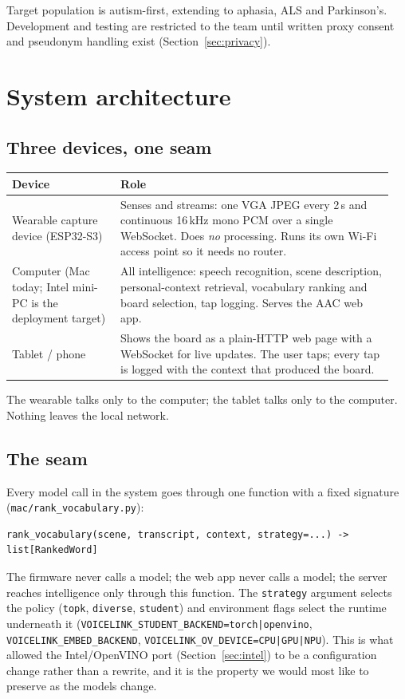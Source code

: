\documentclass[11pt]{article}
\newcommand{\code}[1]{\texttt{#1}}
\newcommand{\file}[1]{\texttt{\small #1}}
\begin{document}
Target population is autism-first, extending to aphasia, ALS and Parkinson's.
Development and testing are restricted to the team until written proxy consent
and pseudonym handling exist (Section~\ref{sec:privacy}).

\section{System architecture}
\subsection{Three devices, one seam}
\begin{center}
\begin{tabular}{@{}p{0.27\linewidth}p{0.68\linewidth}@{}}
\toprule
\textbf{Device} & \textbf{Role} \\ \midrule
Wearable capture device (ESP32-S3) & Senses and streams: one VGA JPEG every 2\,s and continuous 16\,kHz mono PCM over a single WebSocket. Does \emph{no} processing. Runs its own Wi-Fi access point so it needs no router. \\
Computer (Mac today; Intel mini-PC is the deployment target) & All intelligence: speech recognition, scene description, personal-context retrieval, vocabulary ranking and board selection, tap logging. Serves the AAC web app. \\
Tablet / phone & Shows the board as a plain-HTTP web page with a WebSocket for live updates. The user taps; every tap is logged with the context that produced the board. \\
\bottomrule
\end{tabular}
\end{center}
The wearable talks only to the computer; the tablet talks only to the computer.
Nothing leaves the local network.

\subsection{The seam}
Every model call in the system goes through one function with a fixed signature
(\file{mac/rank\_vocabulary.py}):
\begin{lstlisting}
rank_vocabulary(scene, transcript, context, strategy=...) -> list[RankedWord]
\end{lstlisting}
The firmware never calls a model; the web app never calls a model; the server
reaches intelligence only through this function. The \code{strategy} argument
selects the policy (\code{topk}, \code{diverse}, \code{student}) and environment
flags select the runtime underneath it
(\code{VOICELINK\_STUDENT\_BACKEND=torch|openvino},
\code{VOICELINK\_EMBED\_BACKEND}, \code{VOICELINK\_OV\_DEVICE=CPU|GPU|NPU}).
This is what allowed the Intel/OpenVINO port (Section~\ref{sec:intel}) to be a
configuration change rather than a rewrite, and it is the property we would
most like to preserve as the models change.
\end{document}
